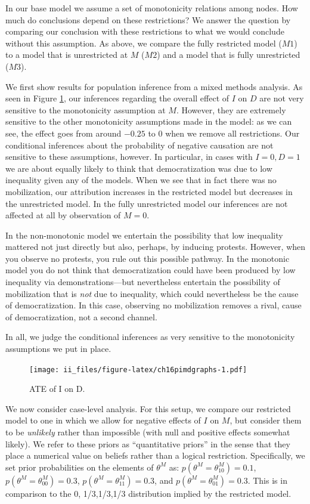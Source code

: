 \documentclass[
  12pt,
]{book}
\begin{document}
In our base model we assume a set of monotonicity relations among nodes. How much do conclusions depend on these restrictions? We answer the question by comparing our conclusion with these restrictions to what we would conclude without this assumption. As above, we compare the fully restricted model (\(M1\)) to a model that is unrestricted at \(M\) (\(M2\)) and a model that is fully unrestricted (\(M3\)).

We first show results for population inference from a mixed methods analysis. As seen in Figure \ref{fig:ch16pimdgraphs}, our inferences regarding the overall effect of \(I\) on \(D\) are not very sensitive to the monotonicity assumption at \(M\). However, they are extremely sensitive to the other monotonicity assumptions made in the model: as we can see, the effect goes from around \(-0.25\) to \(0\) when we remove all restrictions. Our conditional inferences about the probability of negative causation are not sensitive to these assumptions, however. In particular, in cases with \(I=0, D=1\) we are about equally likely to think that democratization was due to low inequality given any of the models. When we see that in fact there was no mobilization, our attribution increases in the restricted model but decreases in the unrestricted model. In the fully unrestricted model our inferences are not affected at all by observation of \(M=0\).

In the non-monotonic model we entertain the possibility that low inequality mattered not just directly but also, perhaps, by inducing protests. However, when you observe no protests, you rule out this possible pathway. In the monotonic model you do not think that democratization could have been produced by low inequality via demonstrations---but nevertheless entertain the possibility of mobilization that is \emph{not} due to inequality, which could nevertheless be the cause of democratization. In this case, observing no mobilization removes a rival, cause of democratization, not a second channel.

In all, we judge the conditional inferences as very sensitive to the monotonicity assumptions we put in place.

\begin{figure}
\centering
\texttt{[image: ii\_files/figure-latex/ch16pimdgraphs-1.pdf]}
\caption{\label{fig:ch16pimdgraphs}ATE of I on D.}
\end{figure}

We now consider case-level analysis. For this setup, we compare our restricted model to one in which we allow for negative effects of \(I\) on \(M\), but consider them to be \emph{unlikely} rather than impossible (with null and positive effects somewhat likely). We refer to these priors as ``quantitative priors'' in the sense that they place a numerical value on beliefs rather than a logical restriction. Specifically, we set prior probabilities on the elements of \(\theta^M\) as: \(p(\theta^M=\theta^M_{10})=0.1\), \(p(\theta^M=\theta^M_{00})=0.3\), \(p(\theta^M=\theta^M_{11})=0.3\), and \(p(\theta^M=\theta^M_{01})=0.3\). This is in comparison to the 0, 1/3,1/3,1/3 distribution implied by the restricted model.
\end{document}
